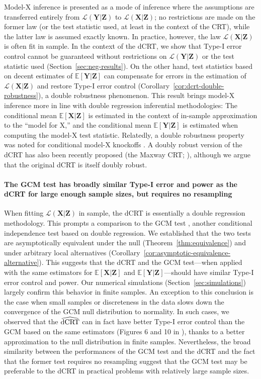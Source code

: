 \documentclass[aos]{imsart}
\theoremstyle{plain}
\theoremstyle{remark}
\newcommand{\E}{\mathbb E}								%
\newcommand{\prx}{\bm X}								%
\newcommand{\prz}{\bm Z}								%
\newcommand{\pry}{{\bm Y}}								%
\newcommand{\law}{\mathcal L}							%
\newcommand{\dCRThat}{\widehat{\textnormal{dCRT}}}		%
\begin{document}
Model-X inference \citep{CetL16} is presented as a mode of inference where the assumptions are transferred entirely from $\law(\pry|\prz)$ to $\law(\prx|\prz)$; no restrictions are made on the former law (or the test statistic used, at least in the context of the CRT), while the latter law is assumed exactly known. In practice, however, the law $\law(\prx|\prz)$ is often fit in sample. In the context of the dCRT, we show that Type-I error control cannot be guaranteed without restrictions on $\law(\pry|\prz)$ or the test statistic used (Section~\ref{sec:neg-results}). On the other hand, test statistics based on decent estimates of $\E[\pry|\prz]$ can compensate for errors in the estimation of $\law(\prx|\prz)$ and restore Type-I error control (Corollary~\ref{cor:dcrt-double-robustness}), a double robustness phenomenon. This result brings model-X inference more in line with double regression inferential methodologies: The conditional mean $\E[\prx|\prz]$ is estimated in the context of in-sample approximation to the ``model for X,'' and the conditional mean $\E[\pry|\prz]$ is estimated when computing the model-X test statistic. Relatedly, a double robustness property was noted for conditional model-X knockoffs \citep{Huang2019}. A doubly robust version of the dCRT has also been recently proposed (the Maxway CRT; \cite{Li2022}), although we argue that the original dCRT is itself doubly robust.

\paragraph*{The GCM test has broadly similar Type-I error and power as the dCRT for large enough sample sizes, but requires no resampling}

When fitting $\law(\prx|\prz)$ in sample, the dCRT is essentially a double regression methodology. This prompts a comparison to the GCM test \citep{Shah2018}, another conditional independence test based on double regression. We established that the two tests are asymptotically equivalent under the null (Theorem~\ref{thm:equivalence}) and under arbitrary local alternatives (Corollary~\ref{cor:asymptotic-equivalence-alternative}). This suggests that the dCRT and the GCM test---when applied with the same estimators for $\E[\prx|\prz]$ and $\E[\pry|\prz]$---should have similar Type-I error control and power. Our numerical simulations (Section~\ref{sec:simulations}) largely confirm this behavior in finite samples. An exception to this conclusion is the case when small samples or discreteness in the data slows down the convergence  of the GCM null distribution to normality. In such cases, we observed that the $\dCRThat$ can in fact have better Type-I error control than the GCM based on the same estimators (Figures 6 and 10 in \cite{supplementary}), thanks to a better approximation to the null distribution in finite samples. Nevertheless, the broad similarity between the performances of the GCM test and the dCRT and the fact that the former test requires no resampling suggest that the GCM test may be preferable to the dCRT in practical problems with relatively large sample sizes.
\end{document}
